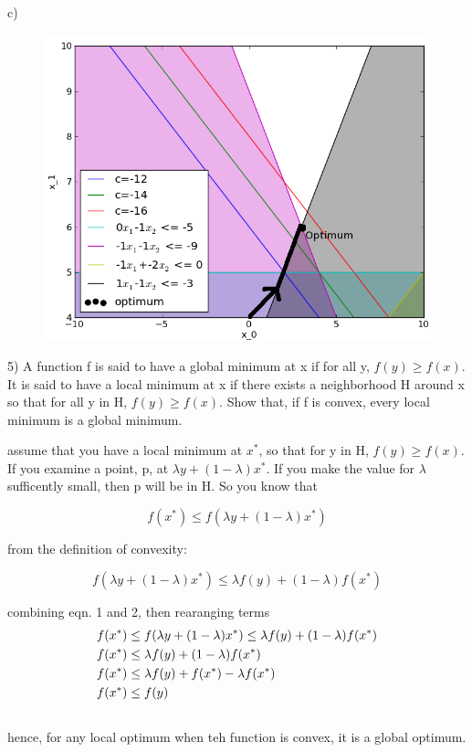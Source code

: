 \documentclass[12pt]{article}
\begin{document}
\pagebreak
c)
\begin{figure}[H]
\includegraphics[width=\textwidth]{4_c}
\end{figure}

\pagebreak
\setcounter{equation}{0}
5) A function f is said to have a global minimum at x if for all y, 
$f(y) \geq f(x)$. It is said to have a local minimum at x if there 
exists a neighborhood H around x so that for all y in H, $f(y) \geq f(x)$. 
Show that, if f is convex, every local minimum is a global minimum. 

assume that you have a local minimum at $x^*$, so that for y in H, $f(y) \geq f(x)$. If you 
examine a point, p, at $\lambda y  + (1-\lambda)x^*$. If you make the value for $\lambda$
sufficently small, then p will be in H. So you know that

\begin{equation}
    f(x^*) \leq f(\lambda y  + (1-\lambda)x^*) 
\end{equation}

from the definition of convexity: 

\begin{equation}
    f(\lambda y  + (1-\lambda)x^*) \leq \lambda f(y) + (1-\lambda) f(x^*)
\end{equation}

combining eqn. 1 and 2, then rearanging terms 
\begin{align}
    f(x^*) &\leq f(\lambda y  + (1-\lambda)x^*) \leq \lambda f(y) + (1-\lambda) f(x^*) \\
    f(x^*) &\leq \lambda f(y) + (1-\lambda) f(x^*) \\ \notag
    f(x^*) &\leq \lambda f(y) + f(x^*) - \lambda f(x^*)\\ \notag
    f(x^*) &\leq f(y)\\ \notag
\end{align}
hence, for any local optimum when teh function is convex, it is a global optimum. 
\end{document}
